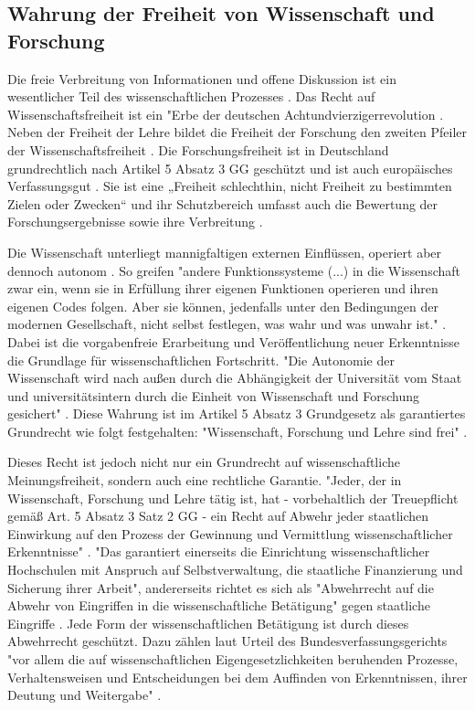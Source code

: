 \subsection{Wahrung der Freiheit von Wissenschaft und Forschung}

Die freie Verbreitung von Informationen und offene Diskussion ist ein wesentlicher Teil des wissenschaftlichen Prozesses \cite{edsall_1976_scientific}. Das Recht auf Wissenschaftsfreiheit ist ein "Erbe der deutschen Achtundvierzigerrevolution \cite{kempny_2013_wissfreiheit}. Neben der Freiheit der Lehre bildet die Freiheit der Forschung den zweiten Pfeiler der Wissenschaftsfreiheit \cite{thurnherr_2014_pubfreiheit}. Die Forschungsfreiheit ist in Deutschland grundrechtlich nach Artikel 5 Absatz 3 GG  geschützt und ist auch europäisches Verfassungsgut \cite{kempny_2013_wissfreiheit}. Sie ist eine „Freiheit schlechthin, nicht Freiheit zu bestimmten Zielen oder Zwecken“ \cite{Boeckenfoerde_1974} und ihr Schutzbereich umfasst auch die Bewertung der Forschungsergebnisse sowie ihre Verbreitung \cite{Pfeiffer_2013_forschungsfreiheit}.

Die Wissenschaft unterliegt mannigfaltigen externen Einflüssen, operiert aber dennoch autonom \cite{Luhmann1998}. So greifen "andere Funktionssysteme (...) in die Wissenschaft zwar ein, wenn sie in Erfüllung ihrer eigenen Funktionen operieren und ihren eigenen Codes folgen. Aber sie können, jedenfalls unter den Bedingungen der modernen Gesellschaft, nicht selbst festlegen, was wahr und was unwahr ist."  \cite{Luhmann1998}. Dabei ist die vorgabenfreie Erarbeitung und Veröffentlichung neuer Erkenntnisse die Grundlage für wissenschaftlichen Fortschritt. "Die Autonomie der Wissenschaft wird nach außen durch die Abhängigkeit der Universität vom Staat und universitätsintern durch die Einheit von Wissenschaft und Forschung gesichert" \cite{Huber_2005}. Diese Wahrung ist im Artikel 5 Absatz 3 Grundgesetz als garantiertes Grundrecht wie folgt festgehalten: "Wissenschaft, Forschung und Lehre sind frei" \cite{suchen_GG}.

Dieses Recht ist jedoch nicht nur ein Grundrecht auf wissenschaftliche Meinungsfreiheit, sondern auch eine rechtliche Garantie. "Jeder, der in Wissenschaft, Forschung und Lehre tätig ist, hat - vorbehaltlich der Treuepflicht gemäß Art. 5 Absatz 3 Satz 2 GG - ein Recht auf Abwehr jeder staatlichen Einwirkung auf den Prozess der Gewinnung und Vermittlung wissenschaftlicher Erkenntnisse" \cite{suchen_BVG}. "Das garantiert einerseits die Einrichtung wissenschaftlicher Hochschulen mit Anspruch auf Selbstverwaltung, die staatliche Finanzierung und Sicherung ihrer Arbeit"\cite{suchen_BVG}, andererseits richtet es sich als "Abwehrrecht auf die Abwehr von Eingriffen in die wissenschaftliche Betätigung" gegen staatliche Eingriffe \cite{mayen_grundrechte_forscher} \cite{spindler_2006_rechtloa}. Jede Form der wissenschaftlichen Betätigung ist durch dieses Abwehrrecht geschützt. Dazu zählen laut Urteil des Bundesverfassungsgerichts "vor allem die auf wissenschaftlichen Eigengesetzlichkeiten beruhenden Prozesse, Verhaltensweisen und Entscheidungen bei dem Auffinden von Erkenntnissen, ihrer Deutung und Weitergabe" \cite{suchen}.

